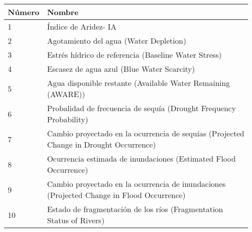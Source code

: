 


    \begin{longtable}{p{1.75cm}|p{13cm}}
        \textbf{Número} & \textbf{Nombre} \\
        \hline\hline
        1                                     & Índice de Aridez- IA                                                                                                                                        \\ \hline
2                                     & Agotamiento del agua (Water Depletion)                                                                                                                    \\ \hline
3                                     & Estrés hídrico de referencia (Baseline Water Stress)                                                                                                       \\ \hline
4                                     & Escasez de agua azul (Blue Water Scarcity)                                                                                                                  \\ \hline
5                                     & Agua disponible restante (Available Water Remaining (AWARE))                                                                                            \\ \hline
6                                     & Probalidad de frecuencia de sequía (Drought Frequency Probability)                              \\ \hline
7                                     & Cambio proyectado en la ocurrencia de sequías (Projected Change in Drought Occurrence)                                                                      \\ \hline
8                                     & Ocurrencia estimada de inundaciones (Estimated Flood Occurrence)                                                                                              \\ \hline
9                                     & Cambio proyectado en la ocurrencia de inundaciones (Projected Change in Flood Occurrence)                                                                   \\ \hline
10                                    & Estado de fragmentación de los ríos (Fragmentation Status of Rivers)                                                                                      \\ \hline

\end{longtable}
